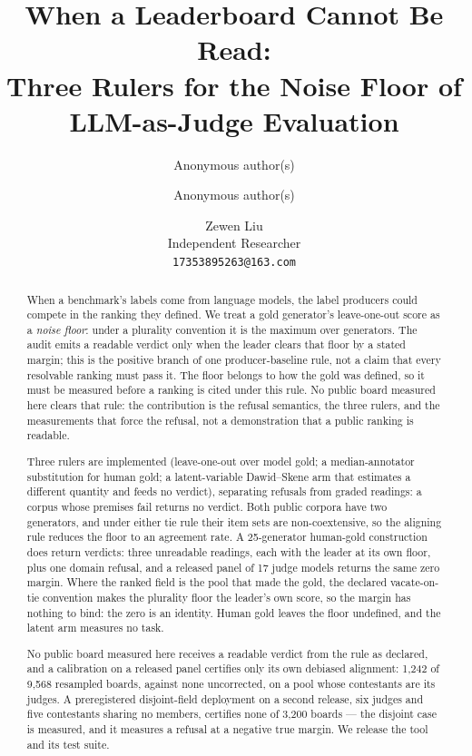 \documentclass{article}
\title{\bfseries When a Leaderboard Cannot Be Read:\\ Three Rulers for the Noise Floor of\\ LLM-as-Judge Evaluation}
\author{Anonymous author(s)}
\author{Anonymous author(s)}
\author{Zewen Liu \\ Independent Researcher \\ \texttt{17353895263@163.com}}
\date{}
\begin{document}
\maketitle
\begin{abstract}
\noindent When a benchmark's labels come from language models, the label producers could compete in the ranking they
defined. We treat a gold generator's leave-one-out score as a \emph{noise floor}: under a plurality convention it is
the maximum over generators. The audit emits a readable verdict only when the leader clears that floor by a stated margin; this is the positive branch of one producer-baseline rule, not a claim that every resolvable ranking must pass it. The floor belongs to how the gold was defined, so it must be measured before a ranking is cited under this rule.
No public board measured here clears that rule: the contribution is the refusal semantics,
the three rulers, and the measurements that force the refusal, not a demonstration that a
public ranking is readable.

Three rulers are implemented (leave-one-out over model gold; a median-annotator substitution for human gold; a
latent-variable Dawid--Skene arm that estimates a different quantity and feeds no verdict), separating refusals from graded readings: a corpus whose premises fail returns no verdict. Both public corpora have two generators, and under either tie rule their item sets are
non-coextensive, so the aligning rule reduces the floor to an agreement rate. A 25-generator human-gold construction does return verdicts:
three unreadable readings, each with the leader at its own floor, plus one domain refusal, and a released panel of 17 judge models returns the same zero margin. Where the ranked
field is the pool that made the gold, the declared \mbox{vacate-on-tie} convention makes the plurality floor the leader's own score, so the margin has nothing to bind: the zero is an identity. Human gold leaves the floor undefined, and the latent arm measures no task.

No public board measured here receives a readable verdict from the rule as declared, and a calibration on a released panel certifies only its own debiased
alignment: 1,242 of 9,568 resampled boards, against none uncorrected, on a pool whose contestants are its
judges. A preregistered disjoint-field deployment on a second release, six judges and five contestants sharing
no members, certifies none of 3,200 boards --- the disjoint case is measured, and it measures a refusal at a
negative true margin. We release the tool and its test suite.
\end{abstract}
\end{document}
